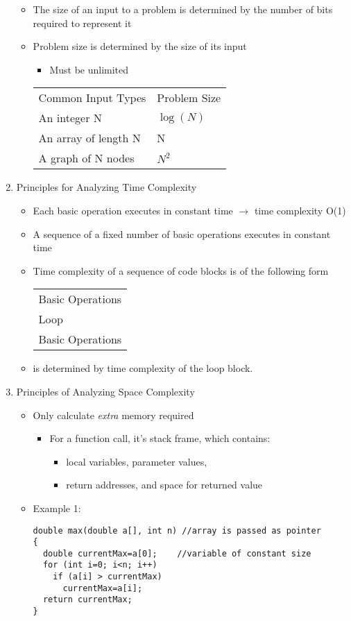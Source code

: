 \begin{enumerate}
  \begin{itemize}
  \item The size of an input to a problem is determined by the number of bits required to represent it
  \item Problem size is determined by the size of its input
    \begin{itemize}
    \item Must be unlimited
    \end{itemize}
  \begin{tabular}{l l}
  \rowcolor{LightCyan} Common Input Types & Problem Size \\
  \rowcolor{DarkCyan} An integer N & $\log{(N)}$ \\
  \rowcolor{LightCyan} An array of length N & N \\
  \rowcolor{DarkCyan} A graph of N nodes & $N^{2}$
  \end{tabular}
  \end{itemize}
\item Principles for Analyzing Time Complexity
  \begin{itemize}
  \item Each basic operation executes in constant time $\rightarrow$ time complexity O(1)
  \item A sequence of a fixed number of basic operations executes in constant time
  \item Time complexity of a sequence of code blocks is of the following form
  \begin{tabular}{l}
  \rowcolor{LightCyan} Basic Operations \\
  \rowcolor{DarkCyan} Loop \\
  \rowcolor{LightCyan}Basic Operations
  \end{tabular}
  \item[] is determined by time complexity of the loop block.
  \end{itemize}
\item Principles of Analyzing Space Complexity
  \begin{itemize}
  \item Only calculate \emph{extra} memory required
    \begin{itemize}
    \item For a function call, it's stack frame, which contains:
      \begin{itemize}
      \item local variables, parameter values,
      \item return addresses, and space for returned value
      \end{itemize}
    \end{itemize}
  \item Example 1:
\begin{lstlisting}
double max(double a[], int n) //array is passed as pointer
{
  double currentMax=a[0];    //variable of constant size
  for (int i=0; i<n; i++)
    if (a[i] > currentMax)
      currentMax=a[i];
  return currentMax;
}
\end{lstlisting}
  \end{itemize}

\end{enumerate}
